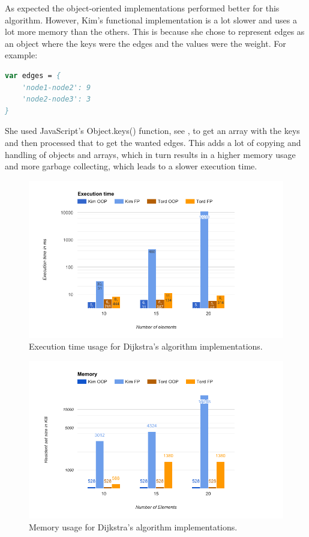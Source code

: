 \documentclass {article}
\begin{document}
As expected the object-oriented implementations performed better for this algorithm. However, Kim's functional implementation is a lot slower and uses a lot more memory than the others. This is because she chose to represent edges as an object where the keys were the edges and the values were the weight. For example:

\begin{lstlisting}[language=Pascal]
var edges = {
	'node1-node2': 9
	'node2-node3': 3
}
\end{lstlisting}

She used JavaScript's Object.keys() function, see \cite{jsref}, to get an array with the keys and then processed that to get the wanted edges. This adds a lot of copying and handling of objects and arrays, which in turn results in a higher memory usage and more garbage collecting, which leads to a slower execution time.

\begin{figure}[H]
\centering
\includegraphics[width=\textwidth]{dijkstras-runtime}

\caption{Execution time usage for Dijkstra's algorithm implementations.}
\label{fig:dijkstras-runtime}
\end{figure}

\begin{figure}[H]
\centering
\includegraphics[width=\textwidth]{dijkstras-memory}

\caption{Memory usage for Dijkstra's algorithm implementations.}
\label{fig:dijkstras-memory}
\end{figure}
\end{document}
